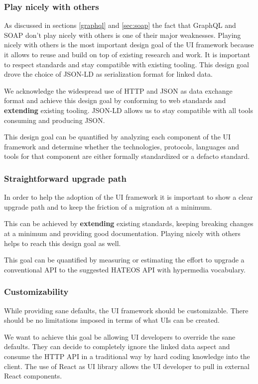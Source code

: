 \subsubsection{Play nicely with others}\label{sec:playnice}
As discussed in sections \ref{graphql} and \ref{sec:soap} the fact that GraphQL and SOAP don't play nicely with others is one of their major weaknesses. Playing nicely with others is the most important design goal of the UI framework because it allows to reuse and build on top of existing research and work.
It is important to respect standards and stay compatible with existing tooling. This design goal drove the choice of JSON-LD as serialization format for linked data.

We acknowledge the widespread use of HTTP and JSON as data exchange format and achieve this design goal by conforming to web standards and \textbf{extending} existing tooling. JSON-LD allows us to stay compatible with all tools consuming and producing JSON.

This design goal can be quantified by analyzing each component of the UI framework and determine whether the technologies, protocols, languages and tools for that component are either formally standardized or a defacto standard.

\subsubsection{Straightforward upgrade path}
In order to help the adoption of the UI framework it is important to show a clear upgrade path and to keep the friction of a migration at a minimum.

This can be achieved by \textbf{extending} existing standards, keeping breaking changes at a minimum and providing good documentation. Playing nicely with others helps to reach this design goal as well.

This goal can be quantified by measuring or estimating the effort to upgrade a conventional API to the suggested HATEOS API with hypermedia vocabulary.

\subsubsection{Customizability}
While providing sane defaults, the UI framework should be customizable. There should be no limitations imposed in terms of what UIs can be created.

We want to achieve this goal be allowing UI developers to override the sane defaults. They can decide to completely ignore the linked data aspect and consume the HTTP API in a traditional way by hard coding knowledge into the client. The use of React as UI library allows the UI developer to pull in external React components.

